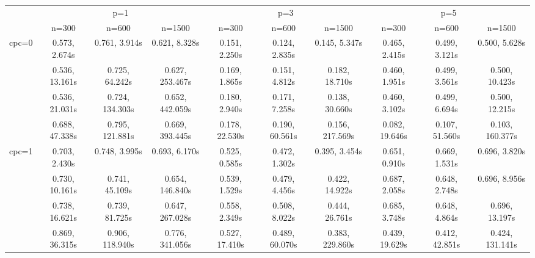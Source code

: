 \documentclass[article]{jss}
\begin{document}
\begin{landscape}

  \begin{table}[t!]
    \centering
    \begin{tabular}{@{}cccccccccc@{}}
    \toprule
                           & \multicolumn{3}{c}{p=1}                                            & \multicolumn{3}{c}{p=3}                                            & \multicolumn{3}{c}{p=5}                                            \\
                           & n=300                & n=600                & n=1500               & n=300                & n=600                & n=1500               & n=300                & n=600                & n=1500               \\ \midrule
    \multirow{4}{*}{cpc=0} & 0.573, 2.674s & 0.761, 3.914s & 0.621, 8.328s & 0.151, 2.250s & 0.124, 2.835s & 0.145, 5.347s & 0.465, 2.415s & 0.499, 3.121s & 0.500, 5.628s \\
                           & 0.536, 13.161s & 0.725, 64.242s & 0.627, 253.467s & 0.169, 1.865s & 0.151, 4.812s & 0.182, 18.710s & 0.460, 1.951s & 0.499, 3.561s & 0.500, 10.423s \\
                           & 0.536, 21.031s & 0.724, 134.303s & 0.652, 442.059s & 0.180, 2.940s & 0.171, 7.258s & 0.138, 30.660s & 0.460, 3.102s & 0.499, 6.694s & 0.500, 12.215s \\
                           & 0.688, 47.338s & 0.795, 121.881s & 0.669, 393.445s & 0.178, 22.530s & 0.190, 60.561s & 0.156, 217.569s & 0.082, 19.646s & 0.107, 51.560s & 0.103, 160.377s \\ \midrule
    \multirow{4}{*}{cpc=1} & 0.703, 2.430s & 0.748, 3.995s & 0.693, 6.170s & 0.525, 0.585s & 0.472, 1.302s & 0.395, 3.454s & 0.651, 0.910s & 0.669, 1.531s & 0.696, 3.820s \\
                           & 0.730, 10.161s & 0.741, 45.109s & 0.654, 146.840s & 0.539, 1.529s & 0.479, 4.456s & 0.422, 14.922s & 0.687, 2.058s & 0.648, 2.748s & 0.696, 8.956s \\
                           & 0.738, 16.621s & 0.739, 81.725s & 0.647, 267.028s & 0.558, 2.349s & 0.508, 8.022s & 0.444, 26.761s & 0.685, 3.748s & 0.648, 4.864s & 0.696, 13.197s \\
                           & 0.869, 36.315s & 0.906, 118.940s & 0.776, 341.056s & 0.527, 17.410s & 0.489, 60.070s & 0.383, 229.860s & 0.439, 19.629s & 0.412, 42.851s & 0.424, 131.141s \\ \midrule

\end{tabular}
\end{table}
\end{landscape}
\end{document}
